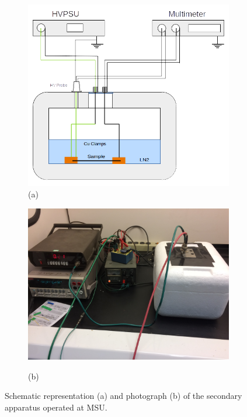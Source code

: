 \documentclass[a4paper,12pt]{article}
\begin{document}
\begin{figure}[htb]
    \centering
    \begin{subfigure}[c]{0.59\linewidth}
    \begin{center}
    \includegraphics[width=\linewidth]{MSU_styro_setup.png}
    (a)
    \end{center}
    \end{subfigure}
    \begin{subfigure}[c]{0.39\linewidth}
    \begin{center}
    \vspace*{4em} 
    
    \includegraphics[width=\linewidth]{MSU_styro_setup_picture.jpg}
    \vspace*{3em} 
    
    (b)
    \end{center}
    \end{subfigure}
    \caption{Schematic representation (a) and photograph (b) of the secondary apparatus operated at MSU.}
    \label{fig:msu_styro_setup}
\end{figure}
\end{document}
